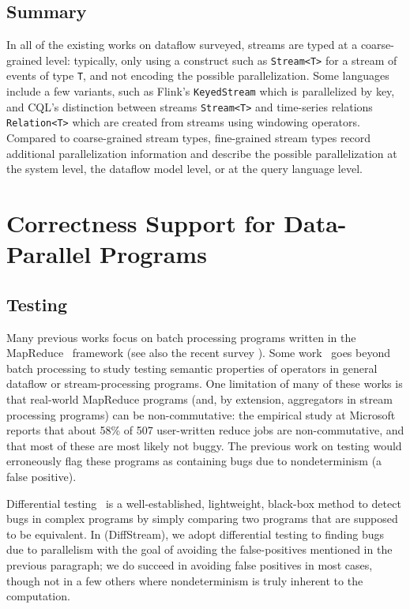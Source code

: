 \subsection{Summary}

In all of the existing works on dataflow surveyed, streams are typed at a coarse-grained level: typically, only using a construct such as \texttt{Stream<T>} for a stream of events of type \texttt{T}, and not encoding the possible parallelization.
Some languages include a few variants, such as Flink's \texttt{KeyedStream} which is parallelized by key, and CQL's distinction between streams \texttt{Stream<T>} and time-series relations \texttt{Relation<T>} which are created from streams using windowing operators.
Compared to coarse-grained stream types, fine-grained stream types
record additional parallelization information and describe the possible parallelization at the system level, the dataflow model level, or at the query language level.

\section{Correctness Support for Data-Parallel Programs}

\subsection{Testing}

Many previous works focus on batch processing programs written in the MapReduce~\cite{dean2008mapreduce} framework \cite{csallner2011new,xu2013semantic,marynowski2012testing,chen2016commutativity} (see also the recent survey \cite{moran2019testing}).
Some work~\cite{xu2013testing} goes beyond batch processing to study testing semantic properties of operators in general dataflow or stream-processing programs.
One limitation of many of these works \cite{csallner2011new,xu2013semantic,xu2013testing,chen2016commutativity} is that real-world MapReduce programs (and, by extension, aggregators in stream processing programs) can be non-commutative: the empirical study at Microsoft~\cite{xiao2014nondeterminism} reports that about 58\% of 507 user-written reduce jobs are non-commutative, and that most of these are most likely not buggy.
The previous work on testing would erroneously flag these programs as containing bugs due to nondeterminism (a false positive).

Differential testing~\cite{mckeeman1998differential,groce2007randomized} is a well-established, lightweight, black-box method to detect bugs in complex programs by simply comparing two programs that are supposed to be equivalent.
In  (DiffStream), we adopt differential testing to finding bugs due to parallelism with the goal of avoiding the false-positives mentioned in the previous paragraph; we do succeed in avoiding false positives in most cases, though not in a few others where nondeterminism is truly inherent to the computation.

